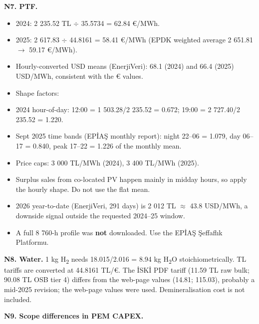 \documentclass[11pt,a4paper]{article}
\begin{document}
\textbf{N7. PTF.}

\begin{itemize}\setlength\itemsep{1pt}

  \item 2024: 2 235.52 TL $\div$ 35.5734 = 62.84 \euro{}/MWh.

  \item 2025: 2 617.83 $\div$ 44.8161 = 58.41 \euro{}/MWh (EPDK weighted average 2 651.81 $\rightarrow$ 59.17 \euro{}/MWh).

  \item Hourly-converted USD means (EnerjiVeri): 68.1 (2024) and 66.4 (2025) USD/MWh, consistent with the \euro{} values.

  \item Shape factors:

  \item 2024 hour-of-day: 12:00 = 1 503.28/2 235.52 = 0.672; 19:00 = 2 727.40/2 235.52 = 1.220.

  \item Sept 2025 time bands (EPİAŞ monthly report): night 22--06 = 1.079, day 06--17 = 0.840, peak 17--22 = 1.226 of the monthly mean.

  \item Price caps: 3 000 TL/MWh (2024), 3 400 TL/MWh (2025).

  \item Surplus sales from co-located PV happen mainly in midday hours, so apply the hourly shape. Do not use the flat mean.

  \item 2026 year-to-date (EnerjiVeri, 291 days) is 2 012 TL $\approx$ 43.8 USD/MWh, a downside signal outside the requested 2024--25 window.

  \item A full 8 760-h profile was \textbf{not} downloaded. Use the EPİAŞ Şeffaflık Platformu.

\end{itemize}

\textbf{N8. Water.} 1 kg H\textsubscript{2} needs 18.015/2.016 = 8.94 kg H\textsubscript{2}O stoichiometrically. TL tariffs are converted at 44.8161 TL/\euro{}. The İSKİ PDF tariff (11.59 TL raw bulk; 90.08 TL OSB tier 4) differs from the web-page values (14.81; 115.03), probably a mid-2025 revision; the web-page values were used. Demineralisation cost is not included.

\textbf{N9. Scope differences in PEM CAPEX.}
\end{document}
